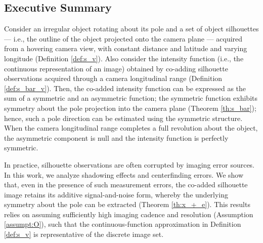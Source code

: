 




\subsection{Executive Summary}
Consider an irregular object rotating about its pole and a set of object silhouettes --- i.e., the outline of the object projected onto the camera plane --- acquired from a hovering camera view, with constant distance and latitude and varying longitude (Definition \ref{def:s_v}). Also consider the intensity function (i.e., the continuous representation of an image) obtained by co-adding silhouette observations acquired through a camera longitudinal range (Definition \ref{def:s_bar_v}). Then, the co-added intensity function can be expressed as the sum of a symmetric and an asymmetric function; the symmetric function exhibits symmetry about the pole projection into the camera plane  (Theorem \ref{th:s_bar}); hence, such a pole direction can be estimated using the symmetric structure. When the camera longitudinal range completes a full revolution about the object, the asymmetric component is null and the intensity function is perfectly symmetric. 

In practice, silhouette observations are often corrupted by imaging error sources. In this work, we analyze shadowing effects and centerfinding errors. We show that, even in the presence of such measurement errors, the co-added silhouette image retains its additive signal-and-noise form, whereby the underlying symmetry about the pole can be extracted (Theorem \ref{th:x_+_e}). This results relies on assuming sufficiently high imaging cadence and resolution (Assumption \ref{assumpt:O}), such that the continuous-function approximation in Definition \ref{def:s_v} is representative of the discrete image set.

